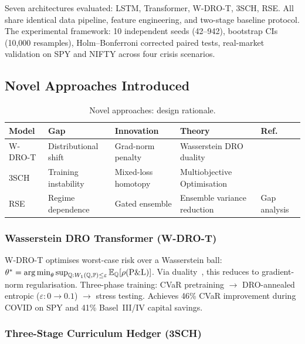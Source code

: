 Seven architectures evaluated: LSTM, Transformer, W-DRO-T, 3SCH, RSE. All share identical data pipeline, feature engineering, and two-stage baseline protocol. The experimental framework: 10 independent seeds (42--942), bootstrap CIs (10,000 resamples), Holm--Bonferroni corrected paired tests, real-market validation on SPY and NIFTY across four crisis scenarios.

\subsection{Novel Approaches Introduced}

\begin{table}[H]
\centering\small
\caption{Novel approaches: design rationale.}
\begin{tabular}{@{}lllll@{}}
\toprule
\textbf{Model} & \textbf{Gap} & \textbf{Innovation} & \textbf{Theory} & \textbf{Ref.} \\\midrule
W-DRO-T & Distributional shift & Grad-norm penalty & Wasserstein DRO duality & \citep{blanchet2019quantifying} \\
3SCH & Training instability & Mixed-loss homotopy & Multiobjective Optimisation & \citep{kozyra2019deep} \\
RSE & Regime dependence & Gated ensemble & Ensemble variance reduction & Gap analysis \\

\bottomrule
\end{tabular}
\end{table}

\subsubsection{Wasserstein DRO Transformer (W-DRO-T)}

W-DRO-T optimises worst-case risk over a Wasserstein ball: $\theta^* = \operatorname*{arg\,min}_\theta \sup_{\mathbb{Q}: W_1(\mathbb{Q},\mathbb{P}) \leq \varepsilon} \mathbb{E}_{\mathbb{Q}}[\rho(\mathrm{P\&L})]$. Via duality~\citep{blanchet2019quantifying}, this reduces to gradient-norm regularisation. Three-phase training: CVaR pretraining $\to$ DRO-annealed entropic ($\varepsilon: 0 \to 0.1$) $\to$ stress testing. Achieves 46\% CVaR improvement during COVID on SPY and 41\% Basel~III/IV capital savings.

\subsubsection{Three-Stage Curriculum Hedger (3SCH)}


